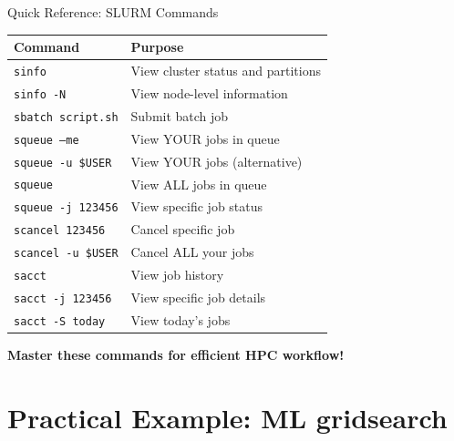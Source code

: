 \documentclass[aspectratio=169]{beamer}
\begin{document}
\begin{frame}[fragile]{Quick Reference: SLURM Commands}
\begin{table}
\small
\begin{tabular}{ll}
\toprule
\textbf{Command} & \textbf{Purpose} \\
\midrule
\texttt{sinfo} & View cluster status and partitions \\
\texttt{sinfo -N} & View node-level information \\
\texttt{sbatch script.sh} & Submit batch job \\
\texttt{squeue --me} & View YOUR jobs in queue \\
\texttt{squeue -u \$USER} & View YOUR jobs (alternative) \\
\texttt{squeue} & View ALL jobs in queue \\
\texttt{squeue -j 123456} & View specific job status \\
\texttt{scancel 123456} & Cancel specific job \\
\texttt{scancel -u \$USER} & Cancel ALL your jobs \\
\texttt{sacct} & View job history \\
\texttt{sacct -j 123456} & View specific job details \\
\texttt{sacct -S today} & View today's jobs \\
\bottomrule
\end{tabular}
\end{table}

\vspace{0.5em}
\centering
\textcolor{ceciblue}{\textbf{Master these commands for efficient HPC workflow!}}
\end{frame}


\section{Practical Example: ML gridsearch}
\end{document}
